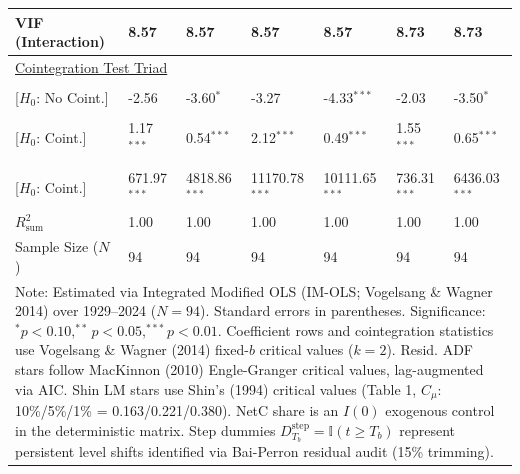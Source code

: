 \begin{table}[H]
\begin{tabular}{p{3.8cm}p{2.1cm}p{2.1cm}p{2.1cm}p{2.1cm}p{2.1cm}p{2.1cm}}
VIF (Interaction) & 8.57 & 8.57 & 8.57 & 8.57 & 8.73 & 8.73  \\
\midrule
\multicolumn{7}{l}{\underline{Cointegration Test Triad}} \\
\makecell[l]{Resid. ADF ($t_{\text{ADF}}$) \\ {\scriptsize [$H_0$: No Coint.]}} & -2.56 & -3.60$^{*}$ & -3.27 & -4.33$^{***}$ & -2.03 & -3.50$^{*}$  \\
\makecell[l]{Shin LM ($C_{\text{Shin}}$) \\ {\scriptsize [$H_0$: Coint.]}} & 1.17$^{***}$ & 0.54$^{***}$ & 2.12$^{***}$ & 0.49$^{***}$ & 1.55$^{***}$ & 0.65$^{***}$  \\
\makecell[l]{VW Type 2 ($S_{\text{Type 2}}$) \\ {\scriptsize [$H_0$: Coint.]}} & 671.97$^{***}$ & 4818.86$^{***}$ & 11170.78$^{***}$ & 10111.65$^{***}$ & 736.31$^{***}$ & 6436.03$^{***}$  \\
\midrule
$R^2_{\text{sum}}$ & 1.00 & 1.00 & 1.00 & 1.00 & 1.00 & 1.00  \\
Sample Size ($N$) & 94 & 94 & 94 & 94 & 94 & 94  \\
\bottomrule
\multicolumn{7}{p{16.5cm}}{\footnotesize Note: Estimated via Integrated Modified OLS (IM-OLS; Vogelsang \& Wagner 2014) over 1929--2024 ($N=94$). Standard errors in parentheses. Significance: $^*p<0.10, ^{**}p<0.05, ^{***}p<0.01$. Coefficient rows and cointegration statistics use Vogelsang \& Wagner (2014) fixed-$b$ critical values ($k=2$). Resid. ADF stars follow MacKinnon (2010) Engle-Granger critical values, lag-augmented via AIC. Shin LM stars use Shin's (1994) critical values (Table 1, $C_\mu$: 10\%/5\%/1\% = 0.163/0.221/0.380). NetC share is an $I(0)$ exogenous control in the deterministic matrix. Step dummies $D^{\text{step}}_{T_b} = \mathbb{I}(t \ge T_b)$ represent persistent level shifts identified via Bai-Perron residual audit (15\% trimming).}
\end{tabular}
\end{table}
